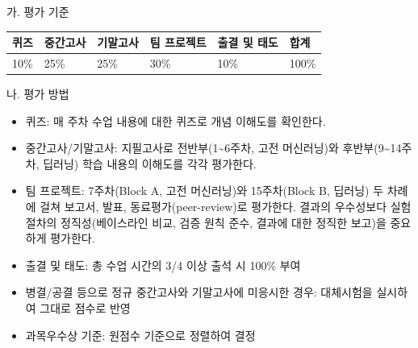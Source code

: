 \documentclass[11pt,a4paper]{article}
\begin{document}
\noindent 가. 평가 기준

\vspace{2mm}

\noindent\small\begin{tabular}{|C{2.2cm}|C{2.2cm}|C{2.2cm}|C{2.2cm}|C{2.2cm}|C{2.2cm}|}

\hline

\bf 퀴즈 & \bf 중간고사 & \bf 기말고사 & \bf 팀 프로젝트 & \bf 출결 및 태도 & \bf 합계 \\

\hline

10\% & 25\% & 25\% & 30\% & 10\% & 100\% \\

\hline

\end{tabular}

\vspace{3mm}

\noindent 나. 평가 방법

\begin{itemize}[leftmargin=8mm,itemsep=0.8mm,topsep=1mm]

\item 퀴즈: 매 주차 수업 내용에 대한 퀴즈로 개념 이해도를 확인한다.

\item 중간고사/기말고사: 지필고사로 전반부(1\textasciitilde{}6주차, 고전 머신러닝)와 후반부(9\textasciitilde{}14주차, 딥러닝) 학습 내용의 이해도를 각각 평가한다.

\item 팀 프로젝트: 7주차(Block A, 고전 머신러닝)와 15주차(Block B, 딥러닝) 두 차례에 걸쳐 보고서, 발표, 동료평가(peer-review)로 평가한다. 결과의 우수성보다 실험 절차의 정직성(베이스라인 비교, 검증 원칙 준수, 결과에 대한 정직한 보고)을 중요하게 평가한다.

\end{itemize}

\vspace{3mm}


\vspace{2mm}

\begin{itemize}[leftmargin=8mm,itemsep=0.8mm,topsep=1mm]

\item 출결 및 태도: 총 수업 시간의 3/4 이상 출석 시 100\% 부여

\item 병결/공결 등으로 정규 중간고사와 기말고사에 미응시한 경우: 대체시험을 실시하여 그대로 점수로 반영

\item 과목우수상 기준: 원점수 기준으로 정렬하여 결정

\end{itemize}
\end{document}

